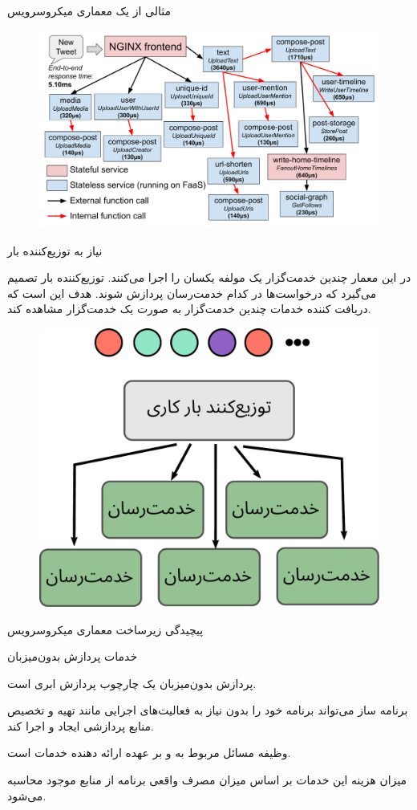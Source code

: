 \begin{frame}{مثالی از یک معماری میکروسرویس}
	\begin{figure}
		\includegraphics[width=0.8\linewidth]{res/tweet_microservice.png}
	\end{figure}
\end{frame}

\begin{frame}{نیاز به توزیع‌کننده بار}
	\begin{itemize}\RTList
	 در این معمار چندین خدمت‌گزار یک مولفه یکسان را اجرا می‌کنند.
	 توزیع‌کننده بار تصمیم می‌گیرد که درخواست‌ها در کدام خدمت‌رسان پردازش شوند.
	 هدف این است که دریافت کننده خدمات چندین خدمت‌گزار به صورت یک خدمت‌گزار مشاهده کند.
	\end{itemize}
	\begin{figure}
		\includegraphics[width=0.4\linewidth]{res/loadbalancer.pdf}
	\end{figure}
\end{frame}

\begin{frame}{پیچیدگی زیرساخت معماری میکروسرویس}
\end{frame}

\begin{frame}{خدمات پردازش بدون‌میزبان}
	\begin{itemize}\RTList
	 پردازش بدون‌میزبان یک چارچوب پردازش ابری است.
	
	 برنامه ساز می‌تواند برنامه خود را بدون
	نیاز به فعالیت‌های اجرایی مانند تهیه و تخصیص منابع پردازشی ایجاد و اجرا کند.
	
	 وظیفه مسائل مربوط به  و  بر عهده ارائه دهنده خدمات است. 
	
	 میزان هزینه این خدمات بر اساس
	میزان مصرف واقعی برنامه از منابع موجود محاسبه می‌شود.
	\end{itemize}
\end{frame}

